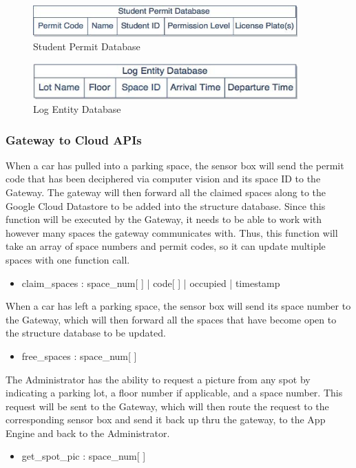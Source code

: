 \documentclass[paper=a4, fontsize=12pt]{scrartcl}
\numberwithin{equation}{section}		%
\numberwithin{figure}{section}			%
\numberwithin{table}{section}				%
\begin{document}
\begin{figure}[H]
\centering
\includegraphics[width=4in]{Cloud_Student.jpg}
\caption{Student Permit Database}
\end{figure}
\begin{figure}[H]
\centering
\includegraphics[width=4in]{Log_DB.png}
\caption{Log Entity Database}
\end{figure}

\subsubsection{Gateway to Cloud APIs} 
When a car has pulled into a parking space, the sensor box will send the permit code that has been deciphered via computer vision and its space ID to the Gateway. The gateway will then forward all the claimed spaces along to the Google Cloud Datastore to be added into the structure database. Since this function will be executed by the Gateway, it needs to be able to work with however many spaces the gateway communicates with. Thus, this function will take an array of space numbers and permit codes, so it can update multiple spaces with one function call.
\begin{itemize}
  \item claim\_spaces : space\_num[ ] | code[ ] | occupied | timestamp 
  \end{itemize}
When a car has left a parking space, the sensor box will send its space number to the Gateway, which will then forward all the spaces that have become open to the structure database to be updated.
\begin{itemize}
  \item free\_spaces : space\_num[ ] 
  \end{itemize}
The Administrator has the ability to request a picture from any spot by indicating a parking lot, a floor number if applicable, and a space number. This request will be sent to the Gateway, which will then route the request to the corresponding sensor box and send it back up thru the gateway, to the App Engine and back to the Administrator. 
\begin{itemize}
  \item get\_spot\_pic : space\_num[ ] 
  \end{itemize}
  
\end{document}
